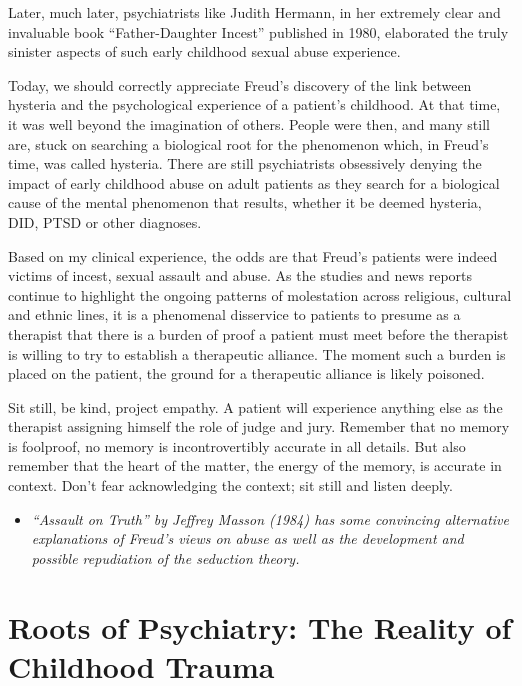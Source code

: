 \documentclass[]{book}
\providecommand{\tightlist}{%
  \setlength{\itemsep}{0pt}\setlength{\parskip}{0pt}}
\begin{document}
Later, much later, psychiatrists like Judith Hermann, in her extremely clear and invaluable book ``Father-Daughter Incest'' published in 1980, elaborated the truly sinister aspects of such early childhood sexual abuse experience.

Today, we should correctly appreciate Freud's discovery of the link between hysteria and the psychological experience of a patient's childhood. At that time, it was well beyond the imagination of others. People were then, and many still are, stuck on searching a biological root for the phenomenon which, in Freud's time, was called hysteria. There are still psychiatrists obsessively denying the impact of early childhood abuse on adult patients as they search for a biological cause of the mental phenomenon that results, whether it be deemed hysteria, DID, PTSD or other diagnoses.

Based on my clinical experience, the odds are that Freud's patients were indeed victims of incest, sexual assault and abuse. As the studies and news reports continue to highlight the ongoing patterns of molestation across religious, cultural and ethnic lines, it is a phenomenal disservice to patients to presume as a therapist that there is a burden of proof a patient must meet before the therapist is willing to try to establish a therapeutic alliance. The moment such a burden is placed on the patient, the ground for a therapeutic alliance is likely poisoned.

Sit still, be kind, project empathy. A patient will experience anything else as the therapist assigning himself the role of judge and jury. Remember that no memory is foolproof, no memory is incontrovertibly accurate in all details. But also remember that the heart of the matter, the energy of the memory, is accurate in context. Don't fear acknowledging the context; sit still and listen deeply.

\begin{itemize}
\tightlist
\item
  \emph{``Assault on Truth'' by Jeffrey Masson (1984) has some convincing alternative explanations of Freud's views on abuse as well as the development and possible repudiation of the seduction theory.}
\end{itemize}

\hypertarget{roots-of-psychiatry-the-reality-of-childhood-trauma}{%
\section{Roots of Psychiatry: The Reality of Childhood Trauma}\label{roots-of-psychiatry-the-reality-of-childhood-trauma}}
\end{document}
